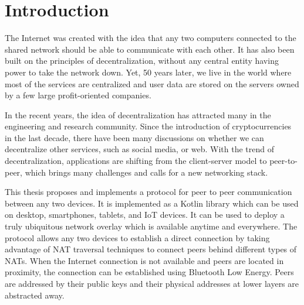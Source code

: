 \chapter{Introduction}


The Internet was created with the idea that any two computers connected to the shared network should be able to communicate with each other. It has also been built on the principles of decentralization, without any central entity having power to take the network down. Yet, 50 years later, we live in the world where most of the services are centralized and user data are stored on the servers owned by a few large profit-oriented companies.

In the recent years, the idea of decentralization has attracted many in the engineering and research community. Since the introduction of cryptocurrencies in the last decade, there have been many discussions on whether we can decentralize other services, such as social media, or web. With the trend of decentralization, applications are shifting from the client-server model to peer-to-peer, which brings many challenges and calls for a new networking stack.


This thesis proposes and implements a protocol for peer to peer communication between any two devices. It is implemented as a Kotlin library which can be used on desktop, smartphones, tablets, and IoT devices. It can be used to deploy a truly ubiquitous network overlay which is available anytime and everywhere. The protocol allows any two devices to establish a direct connection by taking advantage of NAT traversal techniques to connect peers behind different types of NATs. When the Internet connection is not available and peers are located in proximity, the connection can be established using Bluetooth Low Energy. Peers are addressed by their public keys and their physical addresses at lower layers are abstracted away.

